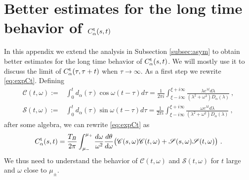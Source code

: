\documentclass[11pt]{article}
\numberwithin{equation}{section}
\numberwithin{theorem}{section}
\newcommand{\matht}[1]{\texorpdfstring{#1}{}}
\newcommand{\matC}{{\mathscr C}}
\newcommand{\matS}{{\mathscr S}}
\begin{document}
\section{Better estimates for the long time behavior of \matht{$C^{\rm t}_\alpha(s,t)$}}\label{app:stime}

In this appendix we extend the analysis in Subsection \ref{subsec:asym} to obtain better estimates
for the long time behavior of $C^{\rm t}_\alpha(s,t)$. We will mostly use it to discuss the limit
of $C_\alpha^{\rm t}(\tau,\tau+t)$ when $\tau\to\infty$.  As a first step we rewrite
\eqref{eq:expCt}. Defining
\[
\begin{aligned}
	\matC(t,\omega):=&\int_0^t
	d_{\alpha}(\tau)\cos\omega(t-\tau)d\tau=\frac{1}{2\pi
		i}\int_{\xi-i\infty}^{\xi+i\infty}\frac{\lambda e^{\lambda
			t}
          d\lambda}{(\lambda^2+\omega^2)D_{\alpha}(\lambda)}\ ,\\
	\matS(t,\omega):=&\int_0^t
	d_{\alpha}(\tau)\sin\omega(t-\tau)d\tau=\frac{1}{2\pi
		i}\int_{\xi-i\infty}^{\xi+i\infty}\frac{\omega e^{\lambda
			t}
          d\lambda}{(\lambda^2+\omega^2)D_{\alpha}(\lambda)}\ ,
\end{aligned}
\]
after some algebra, we can rewrite \eqref{eq:expCt} as
\begin{equation}\label{eq:CS}
C^{\rm t}_\alpha(s,t)=\frac{T_B}{2\pi}\int_{\mu_-}^{\mu_+}\frac{d\omega}{\omega^2}\frac{d\theta}{d\omega}
\bigl(\matC(s,\omega)\matC(t,\omega)+
\matS(s,\omega)\matS(t,\omega)\bigr)\ .
\end{equation}
We thus need to understand the behavior of  $\matC(t,\omega)$ and $\matS(t,\omega)$ for $t$ large and $\omega$ close 
to $\mu_\pm$.                          
\end{document}
